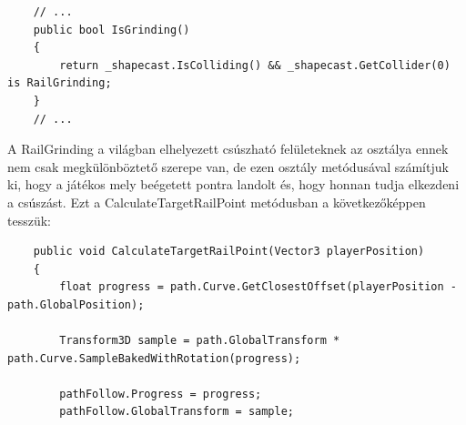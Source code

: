 \begin{itemize}
	\lstset{style=sharpc}
	\begin{lstlisting}
	// ...
	public bool	IsGrinding()
	{
		return _shapecast.IsColliding() && _shapecast.GetCollider(0) is RailGrinding;
	}
	// ...
	\end{lstlisting}
	 A RailGrinding a világban elhelyezett csúszható felületeknek az osztálya ennek nem csak megkülönböztető szerepe van, de ezen osztály metódusával számítjuk ki, hogy a játékos mely beégetett pontra landolt és, hogy honnan tudja elkezdeni a csúszást. Ezt a CalculateTargetRailPoint metódusban a következőképpen tesszük: 
	\lstset{style=sharpc}
	\begin{lstlisting}
	public void CalculateTargetRailPoint(Vector3 playerPosition)
	{
		float progress = path.Curve.GetClosestOffset(playerPosition - path.GlobalPosition);
		
		Transform3D sample = path.GlobalTransform * path.Curve.SampleBakedWithRotation(progress);

		pathFollow.Progress = progress;
		pathFollow.GlobalTransform = sample;
		

\end{lstlisting}
\end{itemize}
